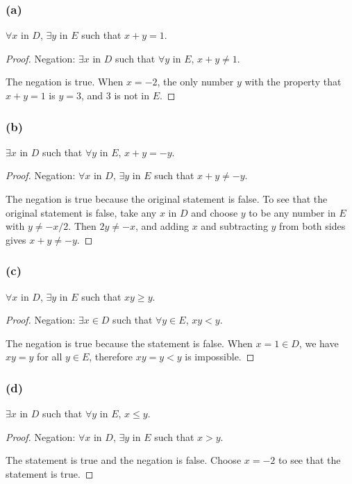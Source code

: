 \documentclass[14pt]{extarticle}
\newcommand{\fa}{\forall}
\newcommand{\te}{\exists}
\begin{document}
\subsubsection{(a)}
$\fa x$ in $D$, $\te y$ in $E$ such that $x + y = 1$.

\begin{proof}
Negation: $\te x$ in $D$ such that $\fa y$ in $E$, $x + y \neq 1$. 

The negation is true. When $x = -2$, the only number $y$ with the property that $x + y = 1$ is $y = 3$, and 3 is not in $E$.
\end{proof}

\subsubsection{(b)}
$\te x$ in $D$ such that $\fa y$ in $E$, $x + y = -y$.

\begin{proof}
Negation: $\fa x$ in $D$, $\te y$ in $E$ such that $x + y \neq -y$. 

The negation is true because the original statement is false. To see that the original statement is false, take any $x$ in $D$ and choose $y$ to be any number in $E$ with $y \neq -x/2$. Then $2y \neq -x$, and adding $x$ and subtracting $y$ from both sides gives $x + y \neq -y$.
\end{proof}

\subsubsection{(c)}
$\fa x$ in $D$, $\te y$ in $E$ such that $xy \geq y$.

\begin{proof}
Negation: $\te x \in D$ such that $\fa y \in E$, $xy < y$.

The negation is true because the statement is false. When $x = 1 \in D$, we have $xy = y$ for all $y \in E$, therefore $xy = y < y$ is impossible.
\end{proof}

\subsubsection{(d)}
$\te x$ in $D$ such that $\fa y$ in $E$, $x \leq y$.

\begin{proof}
Negation: $\fa x$ in $D$, $\te y$ in $E$ such that $x > y$.

The statement is true and the negation is false. Choose $x = -2$ to see that the statement is true.
\end{proof}
\end{document}
